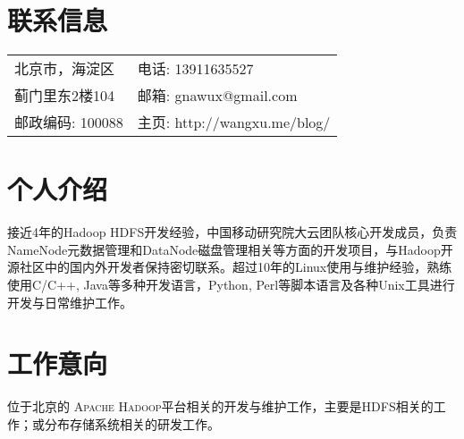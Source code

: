\documentclass[margin,line]{res}
\newcommand{\http}{http:/\hspace{-0.3ex}/}
\begin{document}

\begin{resume}
\section{联系信息}
\vspace{.05in}
\begin{tabular}{@{}p{2in}|p{3in}}
北京市，海淀区 	   & \textsf{电话:} {13911635527}\\         
蓟门里东2楼104     & \textsf{邮箱:} {gnawux@gmail.com}\\       
邮政编码: 100088   & \textsf{主页:} {\http{}wangxu.me/blog/}\\
\end{tabular}

\section{个人介绍}

接近4年的Hadoop HDFS开发经验，中国移动研究院大云团队核心开发成员，负责NameNode元数据管理和DataNode磁盘管理相关等方面的开发项目，与Hadoop开源社区中的国内外开发者保持密切联系。超过10年的Linux使用与维护经验，熟练使用C/C++, Java等多种开发语言，Python, Perl等脚本语言及各种Unix工具进行开发与日常维护工作。

\section{工作意向}

位于北京的\textsc{ Apache Hadoop}平台相关的开发与维护工作，主要是HDFS相关的工作；或分布存储系统相关的研发工作。


\end{resume}
\end{document}
